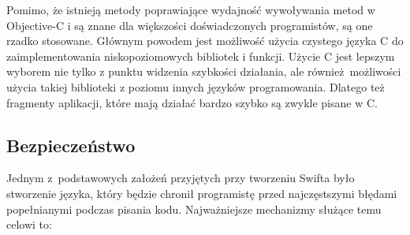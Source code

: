 \documentclass[mgr, shortabstract]{iithesis}
\begin{document}
Pomimo, że istnieją metody poprawiające wydajność wywoływania metod w Objective-C i są znane dla większości doświadczonych programistów, są one rzadko stosowane. Głównym powodem jest możliwość użycia czystego języka C do zaimplementowania niskopoziomowych bibliotek i funkcji. Użycie C jest lepszym wyborem nie tylko z punktu widzenia szybkości działania, ale również możliwości użycia takiej biblioteki z poziomu innych języków programowania. Dlatego też fragmenty aplikacji, które mają działać bardzo szybko są zwykle pisane w C.

\subsection{Bezpieczeństwo}

Jednym z~podstawowych założeń przyjętych przy tworzeniu Swifta było stworzenie języka, który będzie chronił programistę przed najczęstszymi błędami popełnianymi podczas pisania kodu. Najważniejsze mechanizmy służące temu celowi to:
\end{document}
